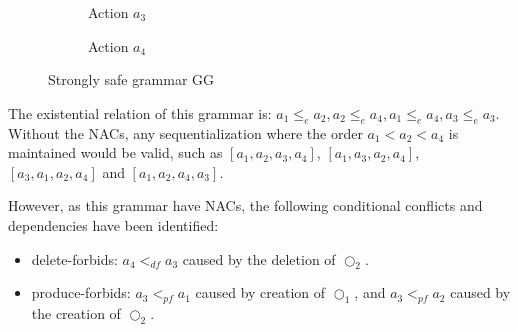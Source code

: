 \begin{example}
\begin{figure}[!ht]
  \begin{subfigure}[t]{.5\textwidth}
    \centerline{}
    \caption{Action $a_3$}\label{fig:process:order:a3}
  \end{subfigure}%
  \begin{subfigure}[t]{.5\textwidth}
    \centerline{}
    \caption{Action $a_4$}\label{fig:process:order:a4}
  \end{subfigure}
  \caption{Strongly safe grammar GG}\label{fig:process:order}
\end{figure}

  The existential relation of this grammar is: $a_1 \leq_e a_2, a_2 \leq_e a_4, a_1 \leq_e a_4, a_3 \leq_e a_3$. Without the NACs, any sequentialization where the order $a_1 < a_2 < a_4$ is maintained would be valid, such as $[a_1, a_2, a_3, a_4]$, $[a_1,a_3,a_2,a_4]$, $[a_3, a_1, a_2, a_4]$ and $[a_1,a_2,a_4,a_3]$.

  However, as this grammar have NACs, the following conditional conflicts and dependencies have been identified:
\begin{itemize}
  \item delete-forbids: $a_4 <_{df} a_3$ caused by the deletion of $\Circle_2$.
  \item produce-forbids: $a_3 <_{pf} a_1$ caused by creation of $\Circle_1$, and $a_3 <_{pf} a_2$ caused by the creation of $\Circle_2$.
\end{itemize}


\end{example}
